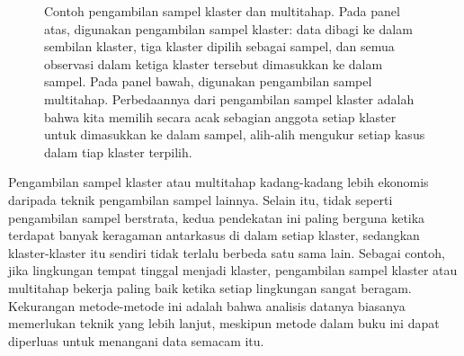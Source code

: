 \begin{figure}
  \centering
  \caption{Contoh pengambilan sampel klaster
  dan multitahap.
  Pada panel atas, digunakan pengambilan sampel klaster:
  data dibagi ke dalam sembilan klaster, tiga klaster dipilih sebagai sampel,
  dan semua observasi dalam ketiga klaster tersebut dimasukkan ke dalam sampel.
  Pada panel bawah, digunakan pengambilan sampel multitahap. Perbedaannya dari
  pengambilan sampel klaster adalah bahwa kita memilih secara acak sebagian
  anggota setiap klaster untuk dimasukkan ke dalam sampel, alih-alih mengukur
  setiap kasus dalam tiap klaster terpilih.}
\label{cluster_multistage}
\end{figure}

Pengambilan sampel klaster atau multitahap kadang-kadang lebih ekonomis daripada
teknik pengambilan sampel lainnya.
Selain itu, tidak seperti pengambilan sampel berstrata, kedua pendekatan ini
paling berguna ketika terdapat banyak keragaman antarkasus di dalam setiap
klaster, sedangkan klaster-klaster itu sendiri tidak terlalu berbeda satu sama
lain. Sebagai contoh, jika lingkungan tempat tinggal menjadi klaster,
pengambilan sampel klaster atau multitahap bekerja paling baik ketika setiap
lingkungan sangat beragam.
Kekurangan metode-metode ini adalah bahwa analisis datanya biasanya memerlukan
teknik yang lebih lanjut, meskipun metode dalam buku ini dapat diperluas untuk
menangani data semacam itu.

